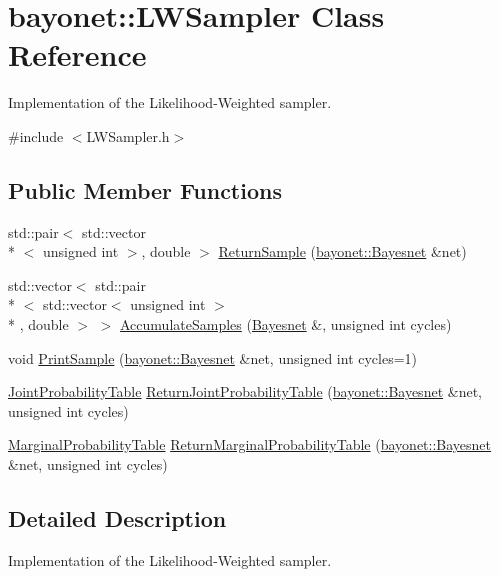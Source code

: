 \hypertarget{classbayonet_1_1_l_w_sampler}{\section{bayonet\-:\-:L\-W\-Sampler Class Reference}
\label{classbayonet_1_1_l_w_sampler}
}


Implementation of the Likelihood-\/\-Weighted sampler.  




{\ttfamily \#include $<$L\-W\-Sampler.\-h$>$}

\subsection*{Public Member Functions}
\begin{DoxyCompactItemize}
\item 
std\-::pair$<$ std\-::vector\\*
$<$ unsigned int $>$, double $>$ \hyperlink{classbayonet_1_1_l_w_sampler_a1da2655dd3332796a3293c3aac8d618d}{Return\-Sample} (\hyperlink{classbayonet_1_1_bayesnet}{bayonet\-::\-Bayesnet} \&net)
\item 
std\-::vector$<$ std\-::pair\\*
$<$ std\-::vector$<$ unsigned int $>$\\*
, double $>$ $>$ \hyperlink{classbayonet_1_1_l_w_sampler_abd25d8f7eb12dd345dbfc8984cadcdbf}{Accumulate\-Samples} (\hyperlink{classbayonet_1_1_bayesnet}{Bayesnet} \&, unsigned int cycles)
\item 
void \hyperlink{classbayonet_1_1_l_w_sampler_a010eacc55fbbb462f50b7ab6b292056f}{Print\-Sample} (\hyperlink{classbayonet_1_1_bayesnet}{bayonet\-::\-Bayesnet} \&net, unsigned int cycles=1)
\item 
\hyperlink{classbayonet_1_1_joint_probability_table}{Joint\-Probability\-Table} \hyperlink{classbayonet_1_1_l_w_sampler_af2fd4c51a13c8cc95f5eaca05941eb47}{Return\-Joint\-Probability\-Table} (\hyperlink{classbayonet_1_1_bayesnet}{bayonet\-::\-Bayesnet} \&net, unsigned int cycles)
\item 
\hyperlink{classbayonet_1_1_marginal_probability_table}{Marginal\-Probability\-Table} \hyperlink{classbayonet_1_1_l_w_sampler_a64fb2a7e19596c4a49fbfcbbe7f0aa86}{Return\-Marginal\-Probability\-Table} (\hyperlink{classbayonet_1_1_bayesnet}{bayonet\-::\-Bayesnet} \&net, unsigned int cycles)
\end{DoxyCompactItemize}


\subsection{Detailed Description}
Implementation of the Likelihood-\/\-Weighted sampler. 

